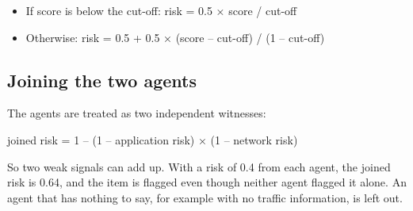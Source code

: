 \documentclass[11pt,a4paper]{article}
\newenvironment{fig}[2]{\par\medskip\noindent\begin{minipage}{\linewidth}\centering
  \refstepcounter{figure}\label{#2}\def\figtext{#1}}
  {\par\vspace{5pt}{\small Figure~\thefigure: \figtext\par}\end{minipage}\par\medskip}
\begin{document}
\begin{itemize}
  \item If score is below the cut-off: risk = 0.5 × score / cut-off
  \item Otherwise: risk = 0.5 + 0.5 × (score -- cut-off) / (1 -- cut-off)
\end{itemize}

\subsection*{Joining the two agents}

The agents are treated as two independent witnesses:

\begin{center}
joined risk = 1 -- (1 -- application risk) × (1 -- network risk)
\end{center}

So two weak signals can add up. With a risk of 0.4 from each agent, the joined risk is 0.64, and the item is flagged even though neither agent flagged it alone. An agent that has nothing to say, for example with no traffic information, is left out.

\begin{fig}{From joined risk to action.}{fig:scale}
\end{fig}
\end{document}
